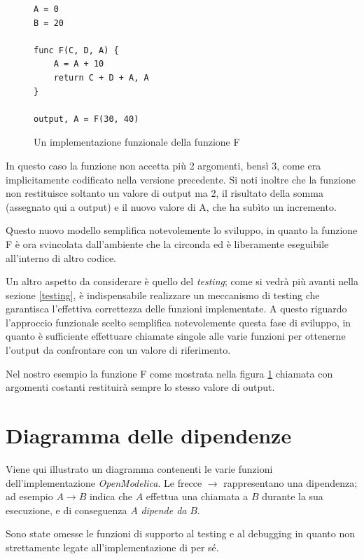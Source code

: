 \documentclass[11pt,a4paper]{report}
\newcommand{\name}[1]{{\ttfamily #1}}
\begin{document}
\begin{figure}[H]
\begin{lstlisting}
A = 0
B = 20

func F(C, D, A) {
	A = A + 10
	return C + D + A, A
}

output, A = F(30, 40)
\end{lstlisting}
\label{implementazione_funzionale_F}
\caption{Un implementazione funzionale della funzione \name{F}}
\end{figure}

In questo caso la funzione non accetta più 2 argomenti, bensì 3, come era implicitamente codificato nella versione precedente. Si noti inoltre che la funzione non restituisce soltanto un valore di output ma 2, il risultato della somma (assegnato qui a \name{output}) e il nuovo valore di \name{A}, che ha subìto un incremento.

Questo nuovo modello semplifica notevolemente lo sviluppo, in quanto la funzione \name{F} è ora svincolata dall'ambiente che la circonda ed è liberamente eseguibile all'interno di altro codice.

Un altro aspetto da considerare è quello del \textit{testing}; come si vedrà più  avanti nella sezione \ref{testing}, è indispensabile realizzare un meccanismo di testing che garantisca l'effettiva correttezza delle funzioni implementate. A questo riguardo l'approccio funzionale scelto semplifica notevolemente questa fase di sviluppo, in quanto è sufficiente effettuare chiamate singole alle varie funzioni per ottenerne l'output da confrontare con un valore di riferimento.

Nel nostro esempio la funzione \name{F} come mostrata nella figura \ref{implementazione_funzionale_F} chiamata con argomenti costanti restituirà sempre lo stesso valore di output.

\section{Diagramma delle dipendenze}

Viene qui illustrato un diagramma contenenti le varie funzioni dell'implementazione \textit{OpenModelica}. Le frecce $\longrightarrow$ rappresentano una dipendenza; ad esempio $A \longrightarrow B$ indica che $A$ effettua una chiamata a $B$ durante la sua esecuzione, e di conseguenza $A$ \textit{dipende da} $B$.

Sono state omesse le funzioni di supporto al testing e al debugging in quanto non strettamente legate all'implementazione di per sé.
\end{document}
